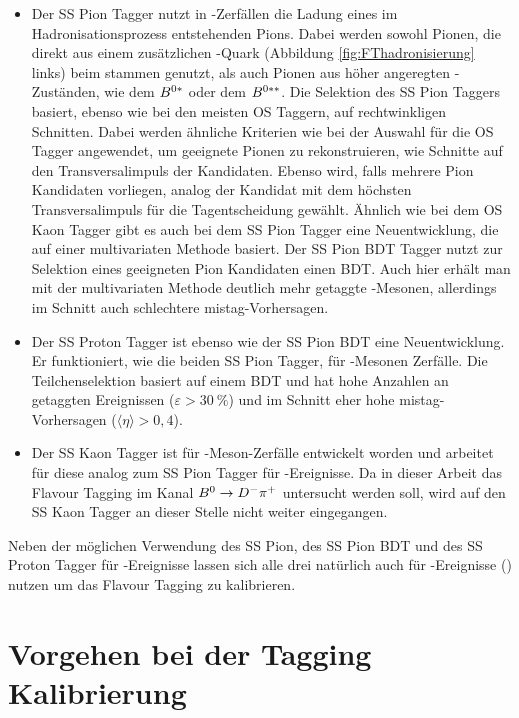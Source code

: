 \begin{itemize}
\item Der SS Pion Tagger nutzt in \Bz-Zerfällen die Ladung eines im Hadronisationsprozess entstehenden Pions. Dabei werden sowohl Pionen, die direkt aus einem zusätzlichen \dquark-Quark (Abbildung \ref{fig:FThadronisierung} links) beim \Bz stammen genutzt, als auch Pionen aus höher angeregten \B-Zuständen, wie dem {{\ensuremath{\B^{0*}}}\xspace} oder dem {{\ensuremath{\B^{0**}}}\xspace}. Die Selektion des SS Pion Taggers basiert, ebenso wie bei den meisten OS Taggern, auf rechtwinkligen Schnitten. Dabei werden ähnliche Kriterien wie bei der Auswahl für die OS Tagger angewendet, um geeignete Pionen zu rekonstruieren, wie Schnitte auf den Transversalimpuls der Kandidaten. Ebenso wird, falls mehrere Pion Kandidaten vorliegen, analog der Kandidat mit dem höchsten Transversalimpuls \pt  für die Tagentscheidung gewählt. Ähnlich wie bei dem OS Kaon Tagger gibt es auch bei dem SS Pion Tagger eine Neuentwicklung, die auf einer multivariaten Methode basiert. Der SS Pion BDT Tagger nutzt zur Selektion  eines geeigneten Pion Kandidaten einen BDT. Auch hier erhält man mit der multivariaten Methode deutlich mehr getaggte \B-Mesonen, allerdings im Schnitt auch schlechtere mistag-Vorhersagen.
\item Der SS Proton Tagger ist ebenso wie der SS Pion BDT eine Neuentwicklung. Er funktioniert, wie die beiden SS Pion Tagger, für \Bz-Mesonen Zerfälle. Die Teilchenselektion basiert auf einem BDT und hat hohe Anzahlen an getaggten Ereignissen ($\varepsilon>\SI{30}{\%}$) und im Schnitt eher hohe mistag-Vorhersagen ($\langle\eta\rangle>0{,}4$).
\item Der SS Kaon Tagger ist für \Bs-Meson-Zerfälle entwickelt worden und arbeitet für diese analog zum SS Pion Tagger für \Bz-Ereignisse. Da in dieser Arbeit das Flavour Tagging im Kanal ${{B}^0}\rightarrow{\ensuremath{{D}^-}}{\ensuremath{{\pi}^+}}$ untersucht werden soll, wird auf den SS Kaon Tagger an dieser Stelle nicht weiter eingegangen.
\end{itemize}
Neben der möglichen Verwendung des SS Pion, des SS Pion BDT und des SS Proton Tagger für \Bz-Ereignisse lassen sich alle drei natürlich auch für \Bu-Ereignisse (\bquarkbar\uquark) nutzen um das Flavour Tagging zu kalibrieren. 

\section{Vorgehen bei der Tagging Kalibrierung}

